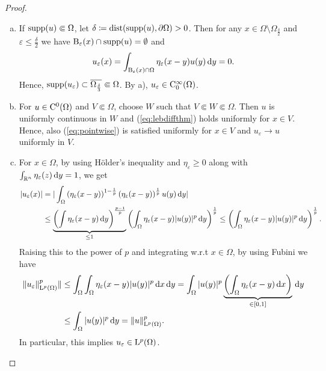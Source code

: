 \begin{proof}
\begin{enumerate}[a)]
    \item If $\operatorname{supp}(u) \Subset \Omega$, let $\delta \coloneqq \operatorname{dist}(\operatorname{supp}(u), \partial \Omega) > 0$.
    Then for any $x \in \Omega \setminus \Omega_{\frac{\delta}{2}}$ and $\varepsilon \leq \frac{\delta}{2}$ we have $\mathrm{B}_\varepsilon(x) \cap \operatorname{supp}(u) = \emptyset$ and 
    $$
    u_\varepsilon(x) = \int_{\mathrm{B}_\varepsilon(x) \cap \Omega} \eta_\varepsilon(x - y) u(y) \, {\operatorname{d}\!{y}} = 0.
    $$
    Hence, $\operatorname{supp}(u_\varepsilon) \subset \overline{\Omega_{\frac{\delta}{3}}} \Subset \Omega$.
    By a), $u_\varepsilon \in \mathrm{C}_0^\infty(\Omega)$.

    \item For $u \in \mathrm{C}^0(\Omega)$ and $V \Subset \Omega$, choose $W$ such that $V \Subset W \Subset \Omega$.
    Then $u$ is uniformly continuous in $W$ and (\ref{eq:lebdiffthm}) holds uniformly for $x \in V$.
    Hence, also (\ref{eq:pointwise}) is satisfied uniformly for $x \in V$ and $u_\varepsilon \to u$ uniformly in $V$.

    \item For $x \in \Omega$, by using Hölder's inequality and $\eta_\varepsilon \geq 0$ along with $\int_{\mathbb{R}^n} \eta_\varepsilon(z) \, {\operatorname{d}\!{y}} = 1$, we get
    \begin{align*}
      |u_\varepsilon(x)| 
      &= | \int_\Omega \left( \eta_\varepsilon(x - y) \right)^{1 - \frac{1}{p}} \left( \eta_\varepsilon(x - y)\right)^{\frac{1}{p}} u(y) \, {\operatorname{d}\!{y}} | \\
      &\leq \underbrace{\left( \int \eta_\varepsilon(x -y) \, {\operatorname{d}\!{y}}\right)^{\frac{p - 1}{p}}}_{\leq 1} \left( \int_\Omega \eta_\varepsilon(x - y) |u(y)|^p \, {\operatorname{d}\!{y}} \right)^\frac{1}{p}
      \leq \left( \int_\Omega \eta_\varepsilon (x - y) |u(y)|^p \, {\operatorname{d}\!{y}} \right)^{\frac{1}{p}}.
    \end{align*}
    Raising this to the power of $p$ and integrating w.r.t $x \in \Omega$, by using Fubini we have
    \begin{align}
      \|u_\varepsilon\|_{\mathrm{L}^p(\Omega)}^p \|
      &\leq \int_\Omega\int_\Omega \eta_\varepsilon(x - y) |u(y)|^p \, {\operatorname{d}\!{x}} \, {\operatorname{d}\!{y}}
      = \int_\Omega |u(y)|^p \underbrace{\left( \int_\Omega \eta_\varepsilon(x -y) \, {\operatorname{d}\!{x}} \right)}_{\in [0,1]} \, {\operatorname{d}\!{y}} \nonumber\\
      &\leq \int_\Omega |u(y)|^p \, {\operatorname{d}\!{y}} = \|u\|_{\mathrm{L}^p(\Omega)}^p.
      \label{eq:lpinequality}
    \end{align}
    In particular, this implies $u_\varepsilon \in \mathrm{L}^p(\Omega)$.


\end{enumerate}
\end{proof}
